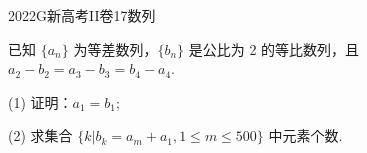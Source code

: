 
\begin{problem}{2022}{G}{新高考II卷}{17}{数列}

已知 $\{a_n\}$ 为等差数列，$\{b_n\}$ 是公比为 2 的等比数列，且 $a_2-b_2=a_3-b_3=b_4-a_4$.

(1) 证明：$a_1=b_1$;

(2) 求集合 $\{k|b_k=a_m+a_1, 1\leqslant m \leqslant 500\}$ 中元素个数.

\end{problem}